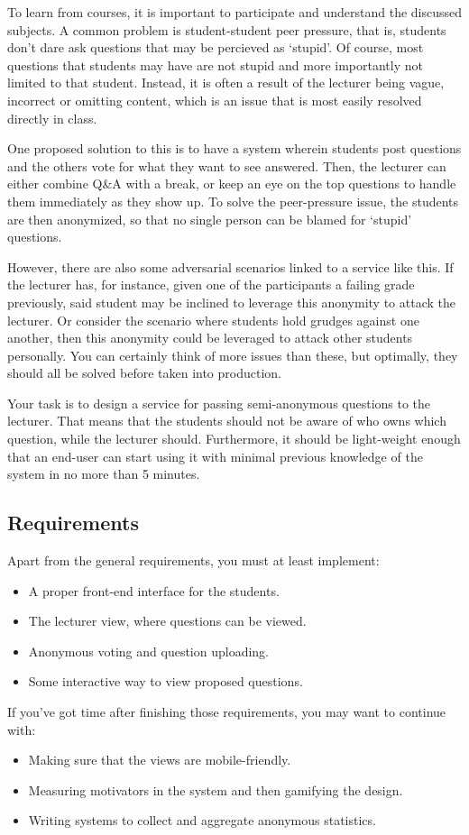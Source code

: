 \begin{refsection}
To learn from courses, it is important to participate and understand the discussed subjects. A common problem is student-student peer pressure, that is, students don't dare ask questions that may be percieved as `stupid'. Of course, most questions that students may have are not stupid and more importantly not limited to that student. Instead, it is often a result of the lecturer being vague, incorrect or omitting content, which is an issue that is most easily resolved directly in class.

One proposed solution to this is to have a system wherein students post questions and the others vote for what they want to see answered. Then, the lecturer can either combine Q\&A with a break, or keep an eye on the top questions to handle them immediately as they show up. To solve the peer-pressure issue, the students are then anonymized, so that no single person can be blamed for `stupid' questions.

However, there are also some adversarial scenarios linked to a service like this. If the lecturer has, for instance, given one of the participants a failing grade previously, said student may be inclined to leverage this anonymity to attack the lecturer. Or consider the scenario where students hold grudges against one another, then this anonymity could be leveraged to attack other students personally. You can certainly think of more issues than these, but optimally, they should all be solved before taken into production.

Your task is to design a service for passing semi-anonymous questions to the lecturer. That means that the students should not be aware of who owns which question, while the lecturer should. Furthermore, it should be light-weight enough that an end-user can start using it with minimal previous knowledge of the system in no more than 5 minutes.

\subsection{Requirements}
Apart from the general requirements, you must at least implement:
\begin{itemize}
    \item A proper front-end interface for the students.
	\item The lecturer view, where questions can be viewed.
	\item Anonymous voting and question uploading.
    \item Some interactive way to view proposed questions.
\end{itemize}
If you've got time after finishing those requirements, you may want to continue with:
\begin{itemize}
    \item Making sure that the views are mobile-friendly.
	\item Measuring motivators in the system and then gamifying the design.
	\item Writing systems to collect and aggregate anonymous statistics.
\end{itemize}
\end{refsection}

